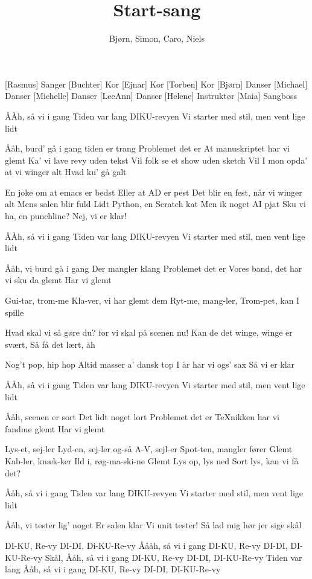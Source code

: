 \documentclass[a4paper,11pt]{article}
\title{Start-sang}
\author{Bjørn, Simon, Caro, Niels}
\begin{document}
\maketitle

\begin{roles}
  [Rasmus] Sanger
  [Buchter] Kor
  [Ejnar] Kor
  [Torben] Kor
  [Bjørn] Danser
  [Michael] Danser
  [Michelle] Danser
  [LeeAnn] Danser
  [Helene] Instruktør
  [Maia] Sangboss
\end{roles}

\begin{song}

%
ÅÅh, så vi i gang
Tiden var lang
DIKU-revyen
Vi starter med stil, men vent lige lidt

Ååh, burd' gå i gang
tiden er trang
Problemet det er
At manuskriptet har vi glemt
%
Ka' vi lave revy uden tekst
Vil folk se et show uden sketch
Vil I mon opda' at vi winger alt
Hvad ku' gå galt

%
En joke om at emacs er bedst
Eller at AD  er pest
Det blir en fest, når vi winger alt
Mens salen blir fuld
Lidt Python, en Scratch kat
Men ik noget AI pjat
Sku vi ha, en punchline?
Nej, vi er klar!

%
ÅÅh, så vi i gang
Tiden var lang
DIKU-revyen
Vi starter med stil, men vent lige lidt

%
Ååh, vi burd gå i gang
Der mangler klang
Problemet det er
Vores band, det har vi sku da glemt
Har vi glemt

%
Gui-tar, trom-me
Kla-ver, vi har glemt dem
Ryt-me, mang-ler,
Trom-pet, kan I spille 

%
Hvad skal vi så gøre du?
for vi skal på scenen nu!
Kan de det winge, winge er svært,
Så få det lært, åh

%
Nog't pop, hip hop
Altid masser a' dansk top
I år har vi ogs' sax
Så vi er klar

%
ÅÅh, så vi i gang
Tiden var lang
DIKU-revyen
Vi starter med stil, men vent lige lidt

%
Ååh, scenen er sort
Det lidt noget lort
Problemet det er
TeXnikken har vi fandme glemt
Har vi glemt

%
Lys-et, sej-ler
Lyd-en, sej-ler og-så
A-V, sejl-er 
Spot-ten, mangler fører
Glemt
Kab-ler, knæk-ker
Ild i, røg-ma-ski-ne
Glemt
Lys op, lys ned
Sort lys, kan vi få det?

%
Ååh, så vi i gang
Tiden var lang
DIKU-revyen
Vi starter med stil, men vent lige lidt

%
Ååh, vi tester lig' noget
Er salen klar
Vi unit tester!
Så lad mig hør jer sige skål

%
DI-KU, Re-vy
DI-DI, Di-KU-Re-vy
Åååh, så vi i gang
DI-KU, Re-vy
DI-DI, DI-KU-Re-vy
Skål, Ååh, så vi i gang
DI-KU, Re-vy
DI-DI, DI-KU-Re-vy
Tiden var lang
Ååh, så vi i gang
DI-KU, Re-vy
DI-DI, DI-KU-Re-vy




\end{song}
\end{document}
